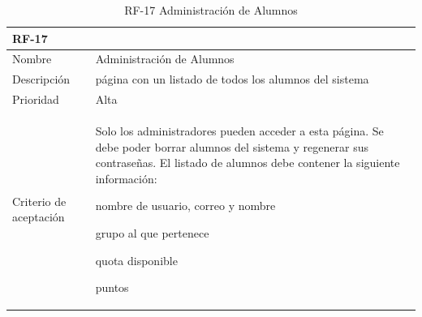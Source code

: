 \documentclass[11pt,spanish,listoffigures,listoftables]{tfgetsinf}
\begin{document}
\begin{table}[ht!]
	\centering
	\begin{tabular}{ |p{4cm}||p{10cm}|  }
		\multicolumn{2}{l}{\textbf{RF-17}} \\
		\hline
		Nombre & Administración de Alumnos \\
		\hline
		Descripción & página con un listado de todos los \gls{alumno}s del sistema  \\
		\hline
		Prioridad & Alta\\
		\hline
		Criterio de aceptación & Solo los \gls{administrador}es pueden acceder a esta página. \newline
		Se debe poder borrar \gls{alumno}s del sistema y regenerar sus contraseñas. \newline
		El listado de \gls{alumno}s debe contener la siguiente información: \newline
		\begin{tabitem}
			\item nombre de usuario, correo y nombre
			\item grupo al que pertenece
			\item \foreignlanguage{english}{quota} disponible
			\item puntos
		\end{tabitem} \\
		\hline
	\end{tabular}
	\caption{RF-17 Administración de Alumnos}
	\label{table:17}
\end{table}
\end{document}
